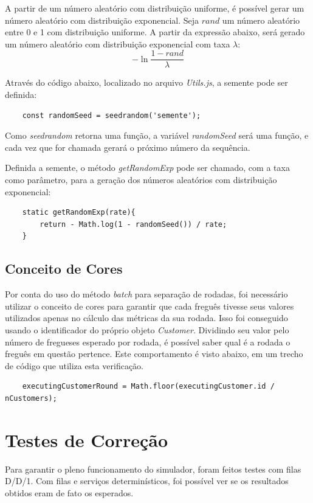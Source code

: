 \documentclass[a4paper,12pt]{report}
\begin{document}
A partir de um número aleatório com distribuição uniforme, é possível gerar um número aleatório com distribuição exponencial. Seja $rand$ um número aleatório entre 0 e 1 com distribuição uniforme. A partir da expressão abaixo, será gerado um número aleatório com distribuição exponencial com taxa $\lambda$:
\[ - \ln \frac{1 - rand}{\lambda}  \]


Através do código abaixo, localizado no arquivo \emph{Utils.js}, a semente pode ser definida:

\begin{lstlisting}
    const randomSeed = seedrandom('semente');
\end{lstlisting}

Como \emph{seedrandom} retorna uma função, a variável \emph{randomSeed} será uma função, e cada vez que for chamada gerará o próximo número da sequência.

Definida a semente, o método \emph{getRandomExp} pode ser chamado, com a taxa como parâmetro, para a geração dos números aleatórios com distribuição exponencial:

\begin{lstlisting}
    static getRandomExp(rate){
        return - Math.log(1 - randomSeed()) / rate;
    }
\end{lstlisting}


\section{Conceito de Cores}

Por conta do uso do método \emph{batch} para separação de rodadas, foi necessário utilizar o conceito de cores para garantir que cada freguês tivesse seus valores utilizados apenas no cálculo das métricas da sua rodada. Isso foi conseguido usando o identificador do próprio objeto \emph{Customer}. Dividindo seu valor pelo número de fregueses esperado por rodada, é possível saber qual é a rodada o freguês em questão pertence. Este comportamento é visto abaixo, em um trecho de código que utiliza esta verificação.

\begin{lstlisting}
	executingCustomerRound = Math.floor(executingCustomer.id / nCustomers);
\end{lstlisting}

\chapter{Testes de Correção}
Para garantir o pleno funcionamento do simulador, foram feitos testes com filas D/D/1. Com filas e serviços determinísticos, foi possível ver se os resultados obtidos eram de fato os esperados.
\end{document}

